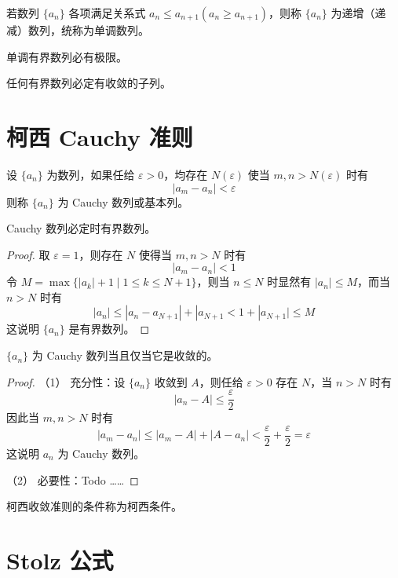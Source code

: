 \begin{definition}
	若数列 $\{a_n\}$ 各项满足关系式 $a_n \leqslant a_{n+1}(a_n \geqslant a_{n+1})$，则称 $\{a_n\}$ 为递增（递减）数列，统称为单调数列。
\end{definition}

\begin{theorem}[单调有界定理]
	单调有界数列必有极限。
\end{theorem}

\begin{theorem}[致密性定理]
	任何有界数列必定有收敛的子列。
\end{theorem}

\section{柯西 Cauchy 准则}

\begin{definition}
	设 $\{a_n\}$ 为数列，如果任给 $\varepsilon>0$，均存在 $N(\varepsilon)$ 使当 $m,n>N(\varepsilon)$ 时有
	$$|a_m-a_n| < \varepsilon$$
	则称 $\{a_n\}$ 为 Cauchy 数列或基本列。
\end{definition}

\begin{theorem}
	Cauchy 数列必定时有界数列。
\end{theorem}
\begin{proof}
	取 $\varepsilon=1$，则存在 $N$ 使得当 $m,n>N$ 时有
	$$|a_m-a_n| < 1$$
	令 $M = \max\{|a_k|+1 \mid 1 \leqslant k \leqslant N+1\}$，则当 $n\leqslant N$ 时显然有 $|a_n|\leqslant M$，而当 $n>N$ 时有
	$$|a_n| \leqslant |a_n-a_{N+1}| + |a_{N+1} < 1+ |a_{N+1}| \leqslant M$$
	这说明 $\{a_n\}$ 是有界数列。
\end{proof}

\begin{theorem}
	$\{a_n\}$ 为 Cauchy 数列当且仅当它是收敛的。
\end{theorem}
\begin{proof}
	（1） 充分性：设 $\{a_n\}$ 收敛到 $A$，则任给 $\varepsilon >0$ 存在 $N$，当 $n>N$ 时有
	$$|a_n-A|\leqslant \frac{\varepsilon}{2}$$
	因此当 $m,n>N$ 时有
	$$|a_m-a_n| \leqslant |a_m-A| + |A-a_n| < \frac{\varepsilon}{2}+\frac{\varepsilon}{2}=\varepsilon$$
	这说明 $a_n$ 为 Cauchy 数列。
	
	（2） 必要性：Todo ……
\end{proof}

柯西收敛准则的条件称为柯西条件。

\section{Stolz 公式}

